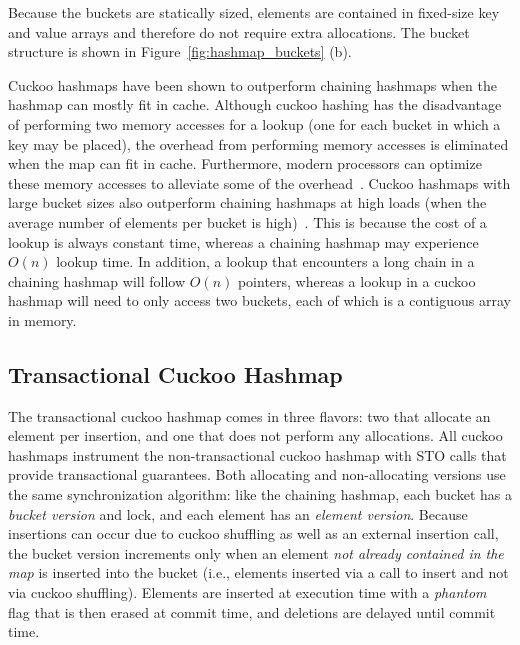 Because the buckets are statically sized, elements are contained in fixed-size key and value arrays and therefore do not require extra allocations. The bucket structure is shown in Figure~\ref{fig:hashmap_buckets} (b). 

Cuckoo hashmaps have been shown to outperform chaining hashmaps when the hashmap can mostly fit in cache. Although cuckoo hashing has the disadvantage of performing two memory accesses for a lookup (one for each bucket in which a key may be placed), the overhead from performing memory accesses is eliminated when the map can fit in cache.
Furthermore, modern processors can optimize these memory accesses to alleviate some of the overhead~\cite{chm_arch}.
Cuckoo hashmaps with large bucket sizes also outperform chaining hashmaps at high loads (when the average number of elements per bucket is high)~\cite{chm_load}. This is because the cost of a lookup is always constant time, whereas a chaining hashmap may experience $O(n)$ lookup time. In addition, a lookup that encounters a long chain in a chaining hashmap will follow $O(n)$ pointers, whereas a lookup in a cuckoo hashmap will need to only access two buckets, each of which is a contiguous array in memory.

\subsection{Transactional Cuckoo Hashmap}
The transactional cuckoo hashmap comes in three flavors: two that allocate an element per insertion, and one that does not perform any allocations. All cuckoo hashmaps instrument the non-transactional cuckoo hashmap with STO calls that provide transactional guarantees.
Both allocating and non-allocating versions use the same synchronization algorithm: like the chaining hashmap, each bucket has a \emph{bucket version} and lock, and each element has an \emph{element version}. Because insertions can occur due to cuckoo shuffling as well as an external insertion call, the bucket version increments only when an element \emph{not already contained in the map} is inserted into the bucket (i.e., elements inserted via a call to insert and not via cuckoo shuffling). Elements are inserted at execution time with a \emph{phantom} flag that is then erased at commit time, and deletions are delayed until commit time.

